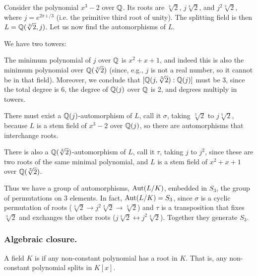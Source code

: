 Consider the polynomial $x^3 - 2$ over $\mathbb{Q}$. Its roots are $\sqrt[3]{2}$, $j \sqrt[3]{2}$, and $j^2 \sqrt[3]{2}$, where $j = e^{2\pi\imath / 3}$ (i.e. the primitive third root of unity). The splitting field is then $L = \mathbb{Q}(\sqrt[3]{2}, j)$. Let us now find the automorphisms of $L$.

We have two towers:

\begin{figure}[h]
\centering
{}
\end{figure}
The minimum polynomial of $j$ over $\mathbb{Q}$ is $x^2 + x + 1$, and indeed this is also the minimum polynomial over $\mathbb{Q}(\sqrt[3]{2})$ (since, e.g., $j$ is not a real number, so it cannot be in that field). Moreover, we conclude that $[\mathbb{Q}(j, \sqrt[3]{2}):\mathbb{Q}(j)]$ must be 3, since the total degree is 6, the degree of $\mathbb{Q}(j)$ over $\mathbb{Q}$ is 2, and degrees multiply in towers.

There must exist a $\mathbb{Q}(j)$-automorphism of $L$, call it $\sigma$, taking $\sqrt[3]{2}$ to $j \sqrt[3]{2}$, because $L$ is a stem field of $x^3 - 2$ over $\mathbb{Q}(j)$, so there are automorphisms that interchange roots. 

There is also a $\mathbb{Q}(\sqrt[3]{2})$-automorphism of $L$, call it $\tau$, taking $j$ to $j^2$, since these are two roots of the same minimal polynomial, and $L$ is a stem field of $x^2 + x + 1$ over $\mathbb{Q}(\sqrt[3]{2})$.

Thus we have a group of automorphisms, $\mathrm{Aut}(L/K)$, embedded in $S_3$, the group of permutations on 3 elements. In fact, $\mathrm{Aut}(L/K) = S_3$, since $\sigma$ is a cyclic permutation of roots ($\sqrt[3]{2} \to j^2 \sqrt[3]{2} \to \sqrt[3]{2}$) and $\tau$ is a transposition that fixes $\sqrt[3]{2}$ and exchanges the other roots ($j \sqrt[3]{2} \leftrightarrow j^2 \sqrt[3]{2}$). Together they generate $S_3$.

\subsubsection{Algebraic closure.}
\begin{dfn}
A field $K$ is  if any non-constant polynomial has a root in $K$. That is, any non-constant polynomial splits in $K[x]$.
\end{dfn}

